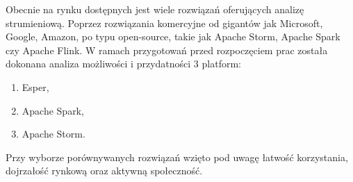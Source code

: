 Obecnie na rynku dostępnych jest wiele rozwiązań oferujących analizę strumieniową.
Poprzez rozwiązania komercyjne od gigantów jak Microsoft, Google, Amazon,
po typu open-source,
takie jak Apache Storm, Apache Spark czy Apache Flink.
W ramach przygotowań przed rozpoczęciem prac została dokonana analiza
możliwości i przydatności 3 platform:
\begin{enumerate}
	\item Esper,
	\item Apache Spark,
	\item Apache Storm.
\end{enumerate}
Przy wyborze porównywanych rozwiązań wzięto pod uwagę
łatwość korzystania,
dojrzałość rynkową
oraz aktywną społeczność.
